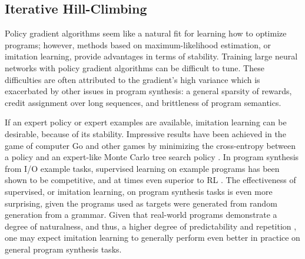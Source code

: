 \documentclass{article}
\begin{document}
\subsection{Iterative Hill-Climbing}

Policy gradient algorithms seem like a natural fit for learning how to optimize programs; however, methods based on maximum-likelihood estimation, or imitation learning, provide advantages in terms of stability. Training large neural networks with policy gradient algorithms can be difficult to tune. These difficulties are often attributed to the gradient's high variance which is exacerbated by other issues in program synthesis: a general sparsity of rewards, credit assignment over long sequences, and brittleness of program semantics. 


If an expert policy or expert examples are available, imitation learning can be desirable, because of its stability. Impressive results have been achieved in the game of computer Go and other games by minimizing the cross-entropy between a policy and an expert-like Monte Carlo tree search policy \cite{silver2017mastering}. In program synthesis from I/O example tasks, supervised learning on example programs has been shown to be competitive, and at times even superior to RL \cite{bunel2018leveraging}. The effectiveness of supervised, or imitation learning, on program synthesis tasks is even more surprising, given the programs used as targets were generated from random generation from a grammar. Given that real-world programs demonstrate a degree of naturalness, and thus, a higher degree of predictability and repetition \cite{hindle2012naturalness}, one may expect imitation learning to generally perform even better in practice on general program synthesis tasks. 
\end{document}

